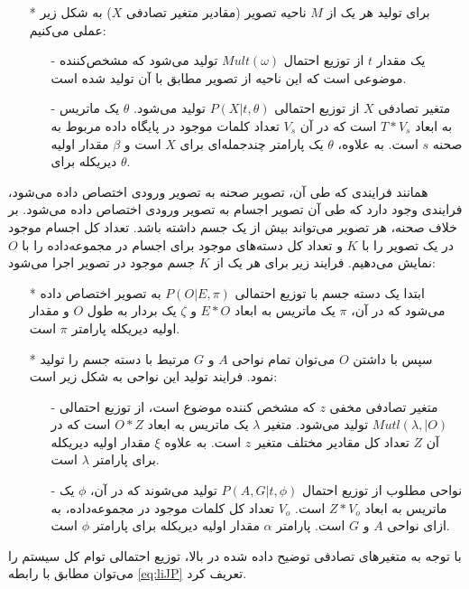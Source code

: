 \begin{enumerate}
\begin{itemize}
\item[*] 
برای تولید هر یک از $M$ ناحیه تصویر (مقادیر متغیر تصادفی $X$) به شکل زیر عملی می‌کنیم:
\begin{itemize}
\item[-]
یک مقدار $t$ از توزیع احتمال $Mult(\omega)$ تولید می‌شود که مشخص‌کننده موضوعی است که این ناحیه از تصویر مطابق با آن تولید شده است.
\item[-]
متغیر تصادفی $X$ از توزیع احتمالی 
$P(X|t,\theta)$ تولید می‌شود.
$\theta$ یک ماتریس به ابعاد
$T * V_s$ است که در آن
$V_s$ تعداد کلمات موجود در پایگاه داده مربوط به صحنه $s$  است.
به علاوه، $\theta$ یک پارامتر چندجمله‌ای برای $X$ است و $\beta$ مقدار اولیه دیریکله برای $\theta$.
\end{itemize}
\end{itemize}

همانند فرایندی که طی آن، تصویر صحنه به تصویر ورودی اختصاص داده می‌شود، فرایندی وجود دارد که طی آن تصویر اجسام به تصویر ورودی اختصاص داده می‌شود. بر خلاف صحنه، هر تصویر می‌تواند بیش از یک جسم داشته باشد. تعداد کل اجسام موجود در یک تصویر را با $K$ و تعداد کل دسته‌های موجود برای اجسام در مجموعه‌داده را با $O$ نمایش می‌دهیم. فرایند زیر برای هر یک از $K$ جسم موجود در تصویر اجرا می‌شود:

\begin{itemize}
\item[*]
ابتدا یک دسته جسم با توزیع احتمالی  
$P(O|E, \pi)$
به تصویر اختصاص داده می‌شود که در آن، $\pi$ یک ماتریس به ابعاد $E * O$ و $\zeta$ یک بردار به طول $O$ و مقدار اولیه دیریکله پارامتر $\pi$ است.
\item[*]
سپس با داشتن $O$ می‌توان تمام نواحی $A$ و $G$ مرتبط با دسته جسم را تولید نمود. فرایند تولید این نواحی به شکل زیر است:
	\begin{itemize}
	\item[-]
	متغیر تصادفی مخفی $z$ که مشخص کننده موضوع است، از توزیع احتمالی $Mutl(\lambda,|O)$ تولید می‌شود. متغیر $\lambda$ یک ماتریس به ابعاد $O * Z$ است که در آن  $Z$ تعداد کل مقادیر مختلف متغیر $z$ است. به علاوه $\xi$ مقدار اولیه دیریکله برای پارامتر $\lambda$ است.
	\item[-]
	نواحی مطلوب از توزیع احتمال $P(A,G|t, \phi)$ تولید می‌شوند که در آن، $\phi$ یک ماتریس به ابعاد $Z * V_o$ است. $V_o$ تعداد کل کلمات موجود در مجموعه‌داده، به ازای نواحی $A$ و $G$ است. پارامتر $\alpha$ مقدار اولیه دیریکله برای پارامتر $\phi$
است. 	
	\end{itemize}
\end{itemize}

با توجه به متغیرهای تصادفی توضیح داده شده در بالا، توزیع احتمالی توام کل سیستم را می‌توان مطابق با رابطه 
\ref{eq:liJP}
تعریف کرد.


\end{enumerate}
